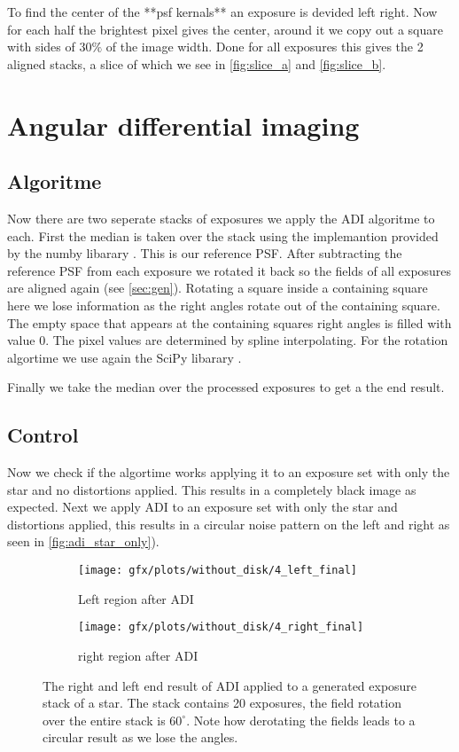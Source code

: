 To find the center of the **psf kernals** an exposure is devided left right. Now for each half the brightest pixel gives the center, around it we copy out a square with sides of $30\%$ of the image width. Done for all exposures this gives the 2 aligned stacks, a slice of which we see in \autoref{fig:slice_a} and \autoref{fig:slice_b}.

\section{Angular differential imaging}
\subsection{Algoritme}
Now there are two seperate stacks of exposures we apply the \ac{ADI} algoritme \cite{Marois_2006} to each. First the median is taken over the stack using the implemantion provided by the numby libarary \cite{numpy}. This is our reference \ac{PSF}. After subtracting the reference \ac{PSF} from each exposure we rotated it back so the fields of all exposures are aligned again (see \autoref{sec:gen}). Rotating a square inside a containing square here we lose information as the right angles rotate out of the containing square. The empty space that appears at the containing squares right angles is filled with value $0$. The pixel values are determined by spline interpolating. For the rotation algortime we use again the SciPy libarary \cite{scipy}.

Finally we take the median over the processed exposures to get a the end result.

\subsection{Control}
Now we check if the algortime works applying it to an exposure set with only the star and no distortions applied. This results in a completely black image as expected. Next we apply \ac{ADI} to an exposure set with only the star and distortions applied, this results in a circular noise pattern on the left and right as seen in \autoref{fig:adi_star_only}).

\begin{figure}[h!]
      \begin{subfigure}[b]{0.5\textwidth}
        \texttt{[image: gfx/plots/without\_disk/4\_left\_final]}
        \caption{Left region after \ac{ADI}}
      \end{subfigure}%
      \begin{subfigure}[b]{0.5\textwidth}
        \texttt{[image: gfx/plots/without\_disk/4\_right\_final]}
        \caption{right region after \ac{ADI}}
      \end{subfigure}      

  \caption{The right and left end result of \ac{ADI} applied to a generated exposure stack of a star. The stack contains 20 exposures, the field rotation over the entire stack is $60^{\circ}$. Note how derotating the fields leads to a circular result as we lose the angles.}
  \label{fig:adi_star_only}
\end{figure}

